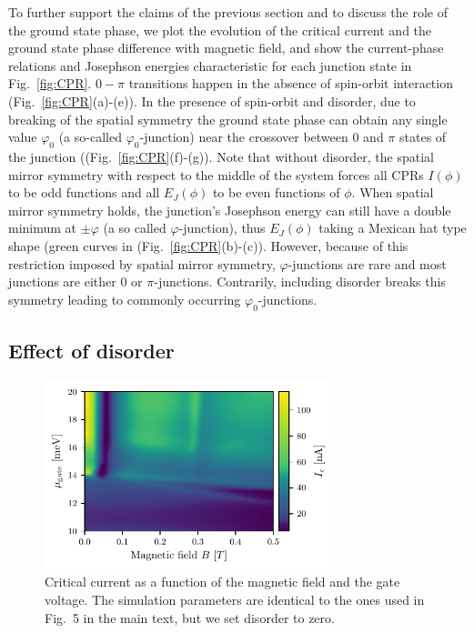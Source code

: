 To further support the claims of the previous section and to discuss the role of the ground state phase, we plot the evolution of the critical current and the ground state phase difference with magnetic field, and show the current-phase relations and Josephson energies characteristic for each junction state in Fig.~\ref{fig:CPR}.
$0-\pi$ transitions happen in the absence of spin-orbit interaction (Fig.~\ref{fig:CPR}(a)-(e)). 
In the presence of spin-orbit and disorder, due to breaking of the spatial symmetry the ground state phase can obtain any single value $\varphi_0$ (a so-called $\varphi_0$-junction) near the crossover between $0$ and $\pi$ states of the junction ((Fig.~\ref{fig:CPR}(f)-(g)).
Note that without disorder, the spatial mirror symmetry with respect to the middle of the system forces all CPRs $I(\phi)$ to be odd functions and all $E_J(\phi)$ to be even functions of $\phi$.
When spatial mirror symmetry holds, the junction's Josephson energy can still have a double minimum at $\pm\varphi$ (a so called $\varphi$-junction), thus $E_J(\phi)$ taking a Mexican hat type shape (green curves in (Fig.~\ref{fig:CPR}(b)-(c)).
However, because of this restriction imposed by spatial mirror symmetry, $\varphi$-junctions are rare and most junctions are either 0 or $\pi$-junctions.
Contrarily, including disorder breaks this symmetry leading to commonly occurring $\varphi_0$-junctions.

\subsection{Effect of disorder}

\begin{figure}[!h]
\centering
\includegraphics[width=0.75\textwidth]{chapter_supercurrent/figures/sup_fig9.pdf}
\caption{Critical current as a function of the magnetic field and the gate voltage. The simulation parameters are identical to the ones used in Fig.~5 in the main text, but we set disorder to zero.\label{fig:gate_dependence}}
\end{figure}

